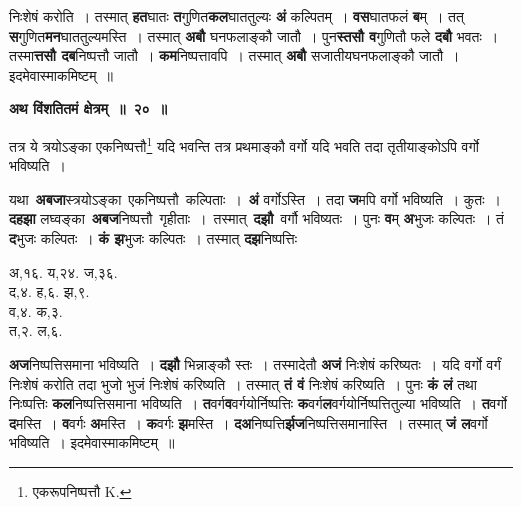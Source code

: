 \documentclass[11pt, openany]{book}
\begin{document}
\newpage
\noindent निःशेषं करोति~। तस्मात् \textbf{हत}घातः \textbf{त}गुणित\textbf{कल}घाततुल्यः \textbf{अं} कल्पितम्~। \textbf{वस}घातफलं \textbf{ब}म्~। तत् \textbf{स}गुणित\textbf{मन}घाततुल्यमस्ति~। तस्मात् \textbf{अबौ} घनफलाङ्कौ जातौ~। पुन\textbf{स्तसौ व}गुणितौ फले \textbf{दबौ} भवतः~। तस्मा\textbf{त्तसौ दब}निष्पत्तौ जातौ~। \textbf{कम}निष्पत्तावपि~। तस्मात् \textbf{अबौ} सजातीयघनफलाङ्कौ जातौ~। इदमेवास्माकमिष्टम्~॥ 
\vspace{2mm}

\begin{center}
\textbf{\large अथ विंशतितमं क्षेत्रम्~॥~२०~॥ }
\end{center}

{\ab तत्र ये त्रयोऽङ्का एकनिष्पत्तौ\renewcommand{\thefootnote}{१}\footnote{एकरूपनिष्पत्तौ {\en K.}} यदि भवन्ति तत्र प्रथमाङ्कौ वर्गो यदि भवति तदा तृतीयाङ्कोऽपि वर्गो भविष्यति~। }

\begin{flushleft}
\begin{minipage}[t]{0.65\textwidth}
\hspace{4mm} यथा \,\textbf{अबजा}स्त्रयोऽङ्का \,एकनिष्पत्तौ \,कल्पिताः~। \,\textbf{अं} वर्गोऽस्ति~। तदा \textbf{ज}मपि वर्गो भविष्यति~। कुतः~। \textbf{दहझा} लघ्वङ्का \,\textbf{अबज}निष्पत्तौ \,गृहीताः~। \,तस्मात् \,\textbf{दझौ} \,वर्गौ भविष्यतः~।  पुनः \textbf{व}म् \textbf{अ}भुजः कल्पितः~। तं \textbf{द}भुजः कल्पितः~। \textbf{कं झ}भुजः कल्पितः~। तस्मात् \textbf{दझ}निष्पत्तिः
\end{minipage} 
\hfill
\begin{minipage}[t]{0.25\textwidth}
अ,१६. य,२४. ज,३६.\\
द,४. ह,६. झ,९.\\
व,४. क,३.\\
त,२. ल,६.
\end{minipage}
\end{flushleft}
\vspace{-3mm}

\noindent \textbf{अज}निष्पत्तिसमाना भविष्यति~। \textbf{दझौ} भिन्नाङ्कौ स्तः~। तस्मादेतौ \textbf{अजं} निःशेषं करिष्यतः~। यदि वर्गो वर्गं निःशेषं करोति तदा भुजो भुजं निःशेषं करिष्यति~। तस्मात् \textbf{तं वं} निःशेषं करिष्यति~। पुनः \textbf{कं लं} तथा निःष्पत्तिः \textbf{कल}निष्पत्तिसमाना भविष्यति~। \textbf{त}वर्ग\textbf{व}वर्गयोर्निष्पत्तिः \textbf{क}वर्ग\textbf{ल}वर्गयोर्निष्पत्तितुल्या भविष्यति~। \textbf{त}वर्गो \textbf{द}मस्ति~। \textbf{व}वर्गः \textbf{अ}मस्ति~। \textbf{क}वर्गः \textbf{झ}मस्ति~। \textbf{दअ}निष्पत्ति\textbf{र्झज}निष्पत्तिसमानास्ति~। तस्मात् \textbf{जं ल}वर्गो भविष्यति~। इदमेवास्माकमिष्टम्~॥ 
\vspace{2mm}
\end{document}
